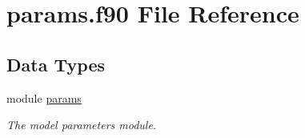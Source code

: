 \hypertarget{params_8f90}{\section{params.\-f90 File Reference}
\label{params_8f90}
}
\subsection*{Data Types}
\begin{DoxyCompactItemize}
\item 
module \hyperlink{classparams}{params}
\begin{DoxyCompactList}\small\item\em The model parameters module. \end{DoxyCompactList}\end{DoxyCompactItemize}
